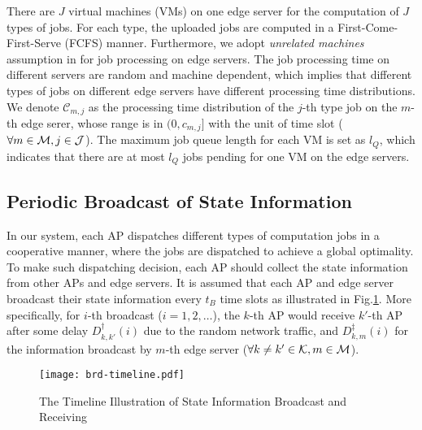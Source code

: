 There are $J$ virtual machines (VMs) on one edge server for the computation of $J$ types of jobs.
For each type, the uploaded jobs are computed in a First-Come-First-Serve (FCFS) manner.
Furthermore, we adopt \emph{unrelated machines} assumption in \cite{tan-online} for job processing on edge servers.
The job processing time on different servers are random and machine dependent, which implies that different types of jobs on different edge servers have different processing time distributions.
We denote $\mathcal{C}_{m,j}$ as the processing time distribution of the $j$-th type job on the $m$-th edge serer, whose range is in $(0, c_{m,j}]$ with the unit of time slot ($\forall m\in\mathcal{M}, j\in\mathcal{J}$).
The maximum job queue length for each VM is set as $l_Q$, which indicates that there are at most $l_Q$ jobs pending for one VM on the edge servers.


\subsection{Periodic Broadcast of State Information}
In our system, each AP dispatches different types of computation jobs in a cooperative manner, where the jobs are dispatched to achieve a global optimality.
To make such dispatching decision, each AP should collect the state information from other APs and edge servers.
It is assumed that each AP and edge server broadcast their state information every $t_B$ time slots as illustrated in Fig.\ref{fig:brd-timeline}.
More specifically, for $i$-th broadcast ($i=1,2,\dots$), the $k$-th AP would receive $k'$-th AP after some delay $D^{\dagger}_{k,k'}(i)$ due to the random network traffic, and $D^{\ddagger}_{k,m}(i)$ for the information broadcast by $m$-th edge server ($\forall k \neq k'\in\mathcal{K}, m\in\mathcal{M}$).
\begin{figure}[ht]
    \centering
    \texttt{[image: brd-timeline.pdf]}
    \caption{The Timeline Illustration of State Information Broadcast and Receiving}
    \label{fig:brd-timeline}
\end{figure}

